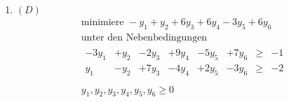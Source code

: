 \documentclass[a4paper]{scrartcl}
\begin{document}
\begin{enumerate}[label=\bfseries\arabic*.]
\begin{enumerate}
\begin{enumerate}[(i)]
\begin{enumerate}
\begin{itemize}
                                \end{itemize}
                        \end{enumerate}
                        

                \end{enumerate}

            \item
                \begin{enumerate}[(i)]
                    \item

                    \item

                    \item

                    \item

                    \item

                \end{enumerate}

        \end{enumerate}

    \item %
        $(D)$
        \begin{equation}
            \begin{gathered}
                \text{minimiere } -y_1 +y_2 +6y_3 +6y_4 -3y_5 +6y_6 \\
                \text{unter den Nebenbedingungen} \\
                \begin{array}{rrrrrrcr}
                    -3y_1 & +y_2 & -2y_3 & +9y_4 & -5y_5 & +7y_6 & \geq & -1 \\
                    y_1 & -y_2 & +7y_3 & -4y_4 & +2y_5 & -3y_6 & \geq & -2 \\
                \end{array} \\
                y_1, y_2, y_3, y_4, y_5, y_6 \geq 0
            \end{gathered}
        \end{equation}


\end{enumerate}
\end{document}
